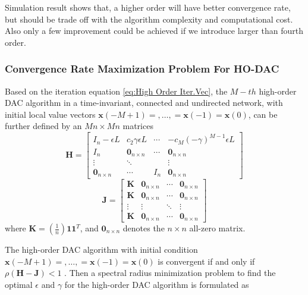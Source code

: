 Simulation result shows that, a higher order will have better convergence
rate, but should be trade off with the algorithm complexity and computational
cost. Also only a few improvement could be achieved if we introduce
larger than fourth order. 


\subsubsection{Convergence Rate Maximization Problem For HO-DAC}

Based on the iteration equation \ref{eq:High Order Iter.Vec}, the
$M-th$ high-order DAC algorithm in a time-invariant, connected and
undirected network, with initial local value vectors $\mathbf{x}(-M+1)=,\ldots,=\mathbf{x}(-1)=\mathbf{x}(0)$,
can be further defined by an $Mn\times Mn$ matrices
\begin{equation}
\mathbf{H}=\left[\begin{array}{cccc}
I_{n}-\epsilon L & c_{2}\gamma\epsilon L & \cdots & -c_{M}(-\gamma)^{M-1}\epsilon L\\
I_{n} & \mathbf{0}_{n\times n} & \cdots & \mathbf{0}_{n\times n}\\
\vdots & \ddots &  & \vdots\\
\mathbf{0}_{n\times n} & \cdots & I_{n} & \mathbf{0}_{n\times n}
\end{array}\right]
\end{equation}
\begin{equation}
\mathbf{J}=\left[\begin{array}{cccc}
\mathbf{K} & \mathbf{0}_{n\times n} & \cdots & \mathbf{0}_{n\times n}\\
\mathbf{K} & \mathbf{0}_{n\times n} & \cdots & \mathbf{0}_{n\times n}\\
\vdots & \vdots & \ddots & \vdots\\
\mathbf{K} & \mathbf{0}_{n\times n} & \cdots & \mathbf{0}_{n\times n}
\end{array}\right]
\end{equation}
 where $\mathbf{K}=\left(\frac{1}{n}\right)\mathbf{1}\mathbf{1}^{T}$,
and $\mathbf{0}_{n\times n}$ denotes the $n\times n$ all-zero matrix. 

The high-order DAC algorithm with initial condition $\mathbf{x}(-M+1)=,\ldots,=\mathbf{x}(-1)=\mathbf{x}(0)$
is convergent if and only if $\rho\left(\mathbf{H}-\mathbf{J}\right)<1$
\cite{Xiong2010}. Then a spectral radius minimization problem to
find the optimal $\epsilon$ and $\gamma$ for the high-order DAC
algorithm is formulated as


